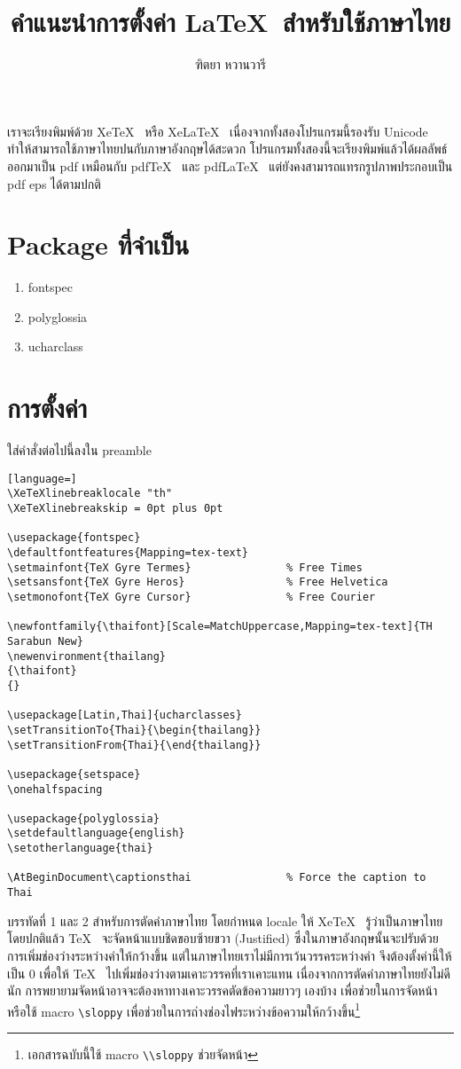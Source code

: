 \documentclass[a4paper,12pt]{article}
\title{คำแนะนำการตั้งค่า \LaTeX~สำหรับใช้ภาษาไทย}
\author{ฑิตยา หวานวารี}
\makeatletter
\newenvironment{thailang}
{\thaifont}
{}
\def\thaialph#1{\expandafter\thalph\csname c@#1\endcsname}
\def\thalph#1{%
    \ifcase#1\or ก\or ข\or ค\or ง\or จ\or ฉ\or ช\or ซ\or
    ฌ\or ญ\or ฎ\or ฏ\or ฐ\or ฑ\or ฒ\or ณ\or ด\or ต\or ถ\or ท\or ธ\or น\or
    บ\or ป\or ผ\or ฝ\or พ\or ฟ\or ภ\or ม\or ย\or ร\or ฤ\or ล\or ฦ\or ว\or
    ศ\or ษ\or ส\or ห\or ฬ\or อ\else ฮ\else\xpg@ill@value{#1}{thalph}\fi}
\makeatother
\begin{document}
    \maketitle

    เราจะเรียงพิมพ์ด้วย Xe\TeX~ หรือ Xe\LaTeX~ เนื่องจากทั้งสองโปรแกรมนี้รองรับ Unicode ทำให้สามารถใช้ภาษาไทยปนกับภาษาอังกฤษได้สะดวก โปรแกรมทั้งสองนี้จะเรียงพิมพ์แล้วได้ผลลัพธ์ออกมาเป็น pdf เหมือนกับ pdf\TeX~ และ pdf\LaTeX~ แต่ยังคงสามารถแทรกรูปภาพประกอบเป็น pdf eps ได้ตามปกติ

\section{Package ที่จำเป็น}
\renewcommand{\theenumi}{\thaialph{enumi}}
\begin{enumerate}
    \item fontspec
    \item polyglossia
    \item ucharclass
\end{enumerate}

\section{การตั้งค่า}
ใส่คำสั่งต่อไปนี้ลงใน preamble
\begin{lstlisting}[language=]
\XeTeXlinebreaklocale "th"
\XeTeXlinebreakskip = 0pt plus 0pt

\usepackage{fontspec}
\defaultfontfeatures{Mapping=tex-text}
\setmainfont{TeX Gyre Termes}				% Free Times
\setsansfont{TeX Gyre Heros}				% Free Helvetica
\setmonofont{TeX Gyre Cursor}				% Free Courier

\newfontfamily{\thaifont}[Scale=MatchUppercase,Mapping=tex-text]{TH Sarabun New}
\newenvironment{thailang}
{\thaifont}
{}

\usepackage[Latin,Thai]{ucharclasses}
\setTransitionTo{Thai}{\begin{thailang}}
\setTransitionFrom{Thai}{\end{thailang}}

\usepackage{setspace}
\onehalfspacing

\usepackage{polyglossia}
\setdefaultlanguage{english}
\setotherlanguage{thai}

\AtBeginDocument\captionsthai               % Force the caption to Thai
\end{lstlisting}

บรรทัดที่ 1 และ 2 สำหรับการตัดคำภาษาไทย โดยกำหนด locale ให้ Xe\TeX~ รู้ว่าเป็นภาษาไทย
โดยปกติแล้ว \TeX~ จะจัดหน้าแบบชิดขอบซ้ายขวา (Justified) ซึ่งในภาษาอังกฤษนั้นจะปรับด้วยการเพิ่มช่องว่างระหว่างคำให้กว้างขึ้น แต่ในภาษาไทยเราไม่มีการเว้นวรรคระหว่างคำ จึงต้องตั้งค่านี้ให้เป็น 0 เพื่อให้ \TeX~ ไปเพิ่มช่องว่างตามเคาะวรรคที่เราเคาะแทน เนื่องจากการตัดคำภาษาไทยยังไม่ดีนัก การพยายามจัดหน้าอาจจะต้องหาทางเคาะวรรคตัดข้อความยาวๆ เองบ้าง เพื่อช่วยในการจัดหน้า หรือใช้ macro \lstinline|\sloppy| เพื่อช่วยในการถ่างช่องไฟระหว่างข้อความให้กว้างขึ้น\footnote{เอกสารฉบับนี้ใช้ macro \lstinline|\\sloppy| ช่วยจัดหน้า}
\end{document}

